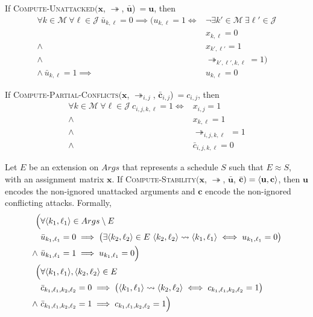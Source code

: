 \begin{lemma}
	\label{computeunattacked}
	
	If \textsc{Compute-Unattacked}$(\mathbf{x}$, $\twoheadrightarrow$, $\bar{\mathbf{u}}$)$\ =\mathbf{u}$, then
	\begin{align*}
		\forall k\in\mathcal{M}\ \forall\ell\in\mathcal{J}\ \bar{u}_{k,\ell}=0\implies\Big(u_{k,\ell}=1\iff&\neg\exists k'\in\mathcal{M}\ \exists\ell'\in\mathcal{J}\\
		&x_{k,\ell}=0\\
		\land\ &x_{k',\ell'}=1\\
		\land\ &\twoheadrightarrow_{k',\ell',k,\ell}=1\Big)\\
		\land\ \bar{u}_{k,\ell}=1\implies&u_{k,\ell}=0
	\end{align*}
\end{lemma}
	
\begin{lemma}
	\label{computepartialconflicts}
	
	If \textsc{Compute-Partial-Conflicts}$(\mathbf{x}$, $\twoheadrightarrow_{i,j}$, $\bar{\mathbf{c}}_{i,j}$)$\ =c_{i,j}$, then
	\begin{align*}
		\forall k\in\mathcal{M}\ \forall\ell\in\mathcal{J}\ c_{i,j,k,\ell}=1\iff&x_{i,j}=1\\
		\land\ &x_{k,\ell}=1\\
		\land\ &\twoheadrightarrow_{i,j,k,\ell}\ =1\\
		\land\ &\bar{c}_{i,j,k,\ell}=0
	\end{align*}
\end{lemma}

\begin{theorem}
	\label{computestability}

	Let $E$ be an extension on $Args$ that represents a schedule $S$ such that $E\approx S$, with an assignment matrix $\mathbf{x}$.
	\linespace
	If \textsc{Compute-Stability}$(\mathbf{x}$, $\twoheadrightarrow$, $\bar{\mathbf{u}}$, $\bar{\mathbf{c}})=\langle{\mathbf{u}},{\mathbf{c}}\rangle$, then $\mathbf{u}$ encodes the non-ignored unattacked arguments and $\mathbf{c}$ encode the non-ignored conflicting attacks.
	\linespace
	Formally, 
	\begin{align*}
		\Big(&\forall\langle{k_1},{\ell_1}\rangle\in Args\setminus E\\
		&\bar{u}_{k_1,\ell_1}=0\implies\big(\exists\langle{k_2},{\ell_2}\rangle\in E\ \langle{k_2},{\ell_2}\rangle\rightsquigarrow\langle{k_1},{\ell_1}\rangle\iff u_{k_1,\ell_1}=0\big)\\
		\land\ &\bar{u}_{k_1,\ell_1}=1\implies u_{k_1,\ell_1}=0\Big)\\
		\Big(&\forall\langle{k_1},{\ell_1}\rangle,\langle{k_2},{\ell_2}\rangle\in E\\
		&\bar{c}_{k_1,\ell_1,k_2,\ell_2}=0\implies\big(\langle{k_1},{\ell_1}\rangle\rightsquigarrow\langle{k_2},{\ell_2}\rangle\iff c_{k_1,\ell_1,k_2,\ell_2}=1\big)\\
		\land\ &\bar{c}_{k_1,\ell_1,k_2,\ell_2}=1\implies c_{k_1,\ell_1,k_2,\ell_2}=1\Big)
\end{align*}
\end{theorem}

